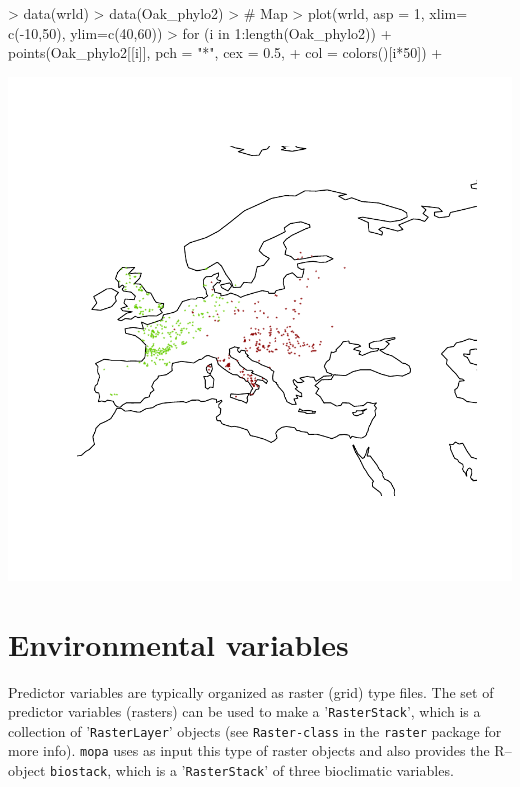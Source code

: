 \documentclass[10pt,a4paper]{report}
\begin{document}
\begin{Schunk}
\begin{Sinput}
> data(wrld)
> data(Oak_phylo2)
> # Map 
> plot(wrld, asp = 1, xlim= c(-10,50), ylim=c(40,60))
> for (i in 1:length(Oak_phylo2)) {
+   points(Oak_phylo2[[i]], pch = "*", cex = 0.5, 
+          col = colors()[i*50])
+ }
\end{Sinput}
\end{Schunk}
\includegraphics{mopa-mopa2}

\section{Environmental variables}

Predictor variables are typically organized as raster (grid) type files. The set of predictor variables (rasters) can be used to make a '\texttt{RasterStack}', which is a collection of '\texttt{RasterLayer}' objects (see \texttt{Raster-class} in the \texttt{raster} package for more info). \texttt{mopa} uses as input this type of raster objects and also provides the R--object \texttt{biostack}, which is a '\texttt{RasterStack}' of three bioclimatic variables.
\end{document}
